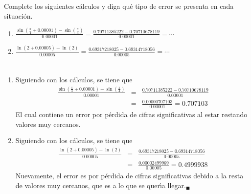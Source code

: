 \begin{enunciado}
 Complete los siguientes c\'alculos y diga qu\'e tipo de error se presenta en cada situaci\'on.
 \begin{enumerate}
  \item $\displaystyle{ \frac{\sin\left( \frac{\pi}{4} + 0.00001 \right) - \sin\left( \frac{\pi}{4} \right)}{0.00001} = \frac{0.70711385222 - 0.70710678119}{0.00001} = \cdots }$
  
  \item $\displaystyle{ \frac{\ln(2 + 0.00005) - \ln(2)}{0.00005} = \frac{0.69317218025 - 0.69314718056}{0.00005} = \cdots }$
 \end{enumerate}
\end{enunciado}

\begin{solucion}
 $\phantom{0}$
 \begin{enumerate}
  \item Siguiendo con los c\'alculos, se tiene que
  \begin{eqnarray*}
   \frac{\sin\left( \frac{\pi}{4} + 0.00001 \right) - \sin\left( \frac{\pi}{4} \right)}{0.00001} & = & \frac{0.70711385222 - 0.70710678119}{0.00001} \\
   & = & \frac{0.00000707103}{0.00001} = 0.707103
  \end{eqnarray*}
  El cual contiene un error por p\'erdida de cifras significativas al estar restando valores muy cercanos.
  
  \item Siguiendo con los c\'alculos, se tiene que
  \begin{eqnarray*}
   \frac{\ln(2 + 0.00005) - \ln(2)}{0.00005} & = & \frac{0.69317218025 - 0.69314718056}{0.00005} \\
   & = & \frac{0.00002499969}{0.00005} = 0.4999938
  \end{eqnarray*}
  Nuevamente, el error es por p\'erdida de cifras significativas debido a la resta de valores muy cercanos, que es a lo que se quer\'{\i}a llegar.${}_{\blacksquare}$
 \end{enumerate}
\end{solucion}
